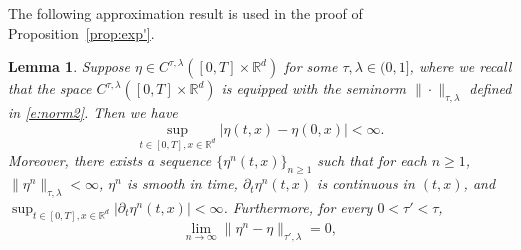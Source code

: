 \documentclass[11pt,reqno]{amsart}
\newtheorem{lemma}{Lemma}[section]
\numberwithin{equation}{section}
\begin{document}
The following approximation result is used in the proof of  Proposition~\ref{prop:exp'}. 		

\begin{lemma}\label{lem:smooth approximation of eta}
Suppose $\eta \in C^{\tau,\lambda}([0,T]\times\mathbb{R}^{d})$ for some $\tau,\lambda\in(0,1]$, where we recall that the space $C^{\tau,\lambda}([0,T]\times\mathbb{R}^d)$ is equipped with the seminorm $\|\cdot\|_{\tau, \lambda}$ defined in \eqref{e:norm2}. Then we have
\begin{equation*}
\sup_{t\in[0,T],x\in\mathbb{R}^{d}}|\eta(t,x) - \eta(0,x)|<\infty.
\end{equation*}
Moreover, there exists a sequence  $\{\eta^{n}(t,x)\}_{n\ge 1}$ such that for each $n\ge 1$,   $\|\eta^{n}\|_{\tau,\lambda}<\infty$, $\eta^{n}$ is smooth in time, $\partial_{t}\eta^{n}(t,x)$ is continuous in $(t,x)$, and  $\sup_{t\in[0,T],x\in\mathbb{R}^{d}}|\partial_{t}\eta^{n}(t,x)|<\infty$. Furthermore, for every $0<\tau'<\tau$, 
\begin{equation*}
\lim_{n\to\infty}\|\eta^{n} - \eta\|_{\tau',\lambda}= 0, 
\end{equation*}	
\end{lemma}
\end{document}
